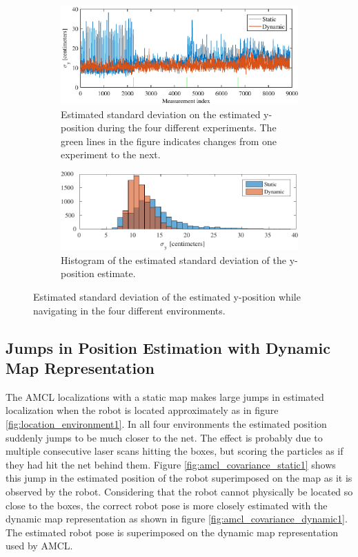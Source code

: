 \begin{figure}[htbp]
	\begin{subfigure}[t]{1\textwidth}	
		\centering	
		\includegraphics[scale=1.0]{chapters/evaluation/figures/location_data_y}	
		\caption{Estimated standard deviation on the estimated y-position during the four different experiments. The green lines in the figure indicates changes from one experiment to the next.}
		\label{fig:location_data_y}
	\end{subfigure}
	
	\begin{subfigure}[t]{1\textwidth}
		\centering
		\includegraphics[scale=1.0]{chapters/evaluation/figures/location_data_hist_y-crop}
		\caption{Histogram of the estimated standard deviation of the y-position estimate.}
		\label{fig:location_data_hist_y}
	\end{subfigure}
	\caption{Estimated standard deviation of the estimated y-position while navigating in the four different environments.}
	\label{fig:location_y_evaluation}
\end{figure}

\subsection{Jumps in Position Estimation with Dynamic Map Representation}
The AMCL localizations with a static map makes large jumps in estimated localization when the robot is located approximately as in figure \ref{fig:location_environment1}. 
In all four environments the estimated position suddenly jumps to be much closer to the net. 
The effect is probably due to multiple consecutive laser scans hitting the boxes, but scoring the particles as if they had hit the net behind them.
Figure \ref{fig:amcl_covariance_static1} shows this jump in the estimated position of the robot superimposed on the map as it is observed by the robot.
Considering that the robot cannot physically be located so close to the boxes, the correct robot pose is more closely estimated with the dynamic map representation as shown in figure \ref{fig:amcl_covariance_dynamic1}.
The estimated robot pose is superimposed on the dynamic map representation used by AMCL.

